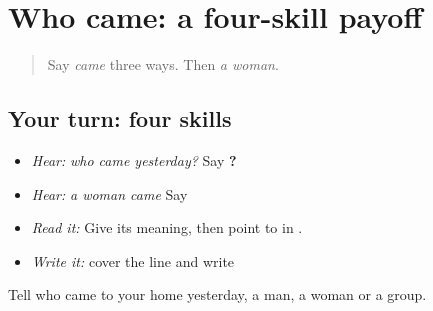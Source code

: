 \section[\texorpdfstring{\pa{ਕੌਣ} \pa{ਆਇਆ}? (kauṇ āiā?)}{ਕੌਣ ਆਇਆ? (kauṇ āiā?)}]{Who came: a four-skill payoff}

\label{lesson:PA-C217-payoff}



\begin{quote}
Say \emph{came} three ways. Then \emph{a woman}.
\end{quote}

\subsection*{Your turn: four skills}
\begin{itemize}
\raggedright
  \item \emph{Hear:} \emph{who came yesterday?} Say \textbf{  ?}
  \item \emph{Hear:} \emph{a woman came} Say \textbf{ }
  \item \emph{Read it:} \textbf{  } Give its meaning, then point to \textbf{} in \textbf{}.
  \item \emph{Write it:} cover the line and write \textbf{  }
\end{itemize}

\begin{tcolorbox}[breakable,colback=teal!4,colframe=teal!35!black,title={Before you move on}]
Tell who came to your home yesterday, a man, a woman or a group.
\end{tcolorbox}
